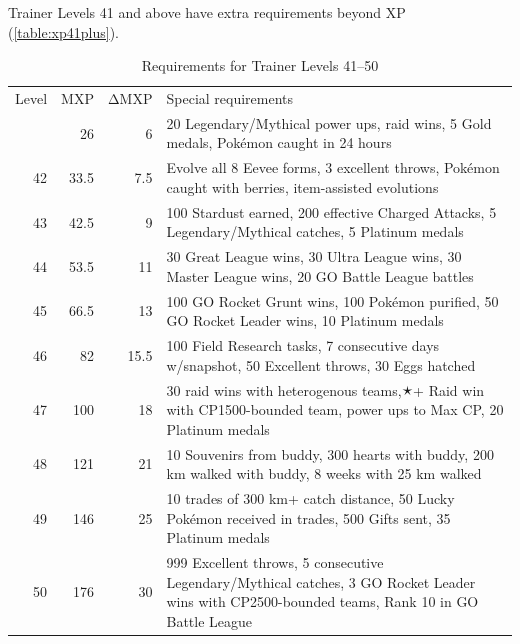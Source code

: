Trainer Levels 41 and above have extra requirements beyond XP (\autoref{table:xp41plus}).
\begin{table}[ht]
\begin{center}
  \begin{tabular}{rrrp{}}
Level & MXP & ΔMXP & Special requirements \\
\Midrule
41 & 26 & 6 & 20 Legendary/Mythical power ups,\newline
                      30 raid wins, 5 Gold medals,\newline
                      200 Pokémon caught in 24 hours\\
42 & 33.5 & 7.5 & Evolve all 8 Eevee forms, 3 excellent throws,\newline
                      200 Pokémon caught with berries,\newline
                      15 item-assisted evolutions\\
43 & 42.5 & 9 & 100 Stardust earned,
                      200 effective Charged Attacks,
                      5 Legendary/Mythical catches,
                      5 Platinum medals \\
44 & 53.5 & 11 & 30 Great League wins,
                       30 Ultra League wins,
                       30 Master League wins,
                       20 GO Battle League battles \\
45 & 66.5 & 13 & 100 GO Rocket Grunt wins,
                       100 Pokémon purified,
                       50 GO Rocket Leader wins,
                       10 Platinum medals\\
46 & 82 & 15.5 & 100 Field Research tasks,
                       7 consecutive days w/snapshot,
                       50 Excellent throws,
                       30 Eggs hatched\\
47 & 100 & 18 & 30 raid wins with heterogenous teams,\newline
                        3🟉+ Raid win with CP1500-bounded team,\newline
                        3 power ups to Max CP, 20 Platinum medals\\
48 & 121 & 21 & 10 Souvenirs from buddy,
                        300 hearts with buddy,
                        200 km walked with buddy,
                        8 weeks with 25 km walked\\
49 & 146 & 25 & 10 trades of 300 km+ catch distance,
                        50 Lucky Pokémon received in trades,
                        500 Gifts sent,
                        35 Platinum medals\\
50 & 176 & 30 & 999 Excellent throws,
                        5 consecutive Legendary/Mythical catches,
                        3 GO Rocket Leader wins with CP2500-bounded teams,
                        Rank 10 in GO Battle League\\
\end{tabular}
\caption{Requirements for Trainer Levels 41--50}
\label{table:xp41plus}
\end{center}
\end{table}
